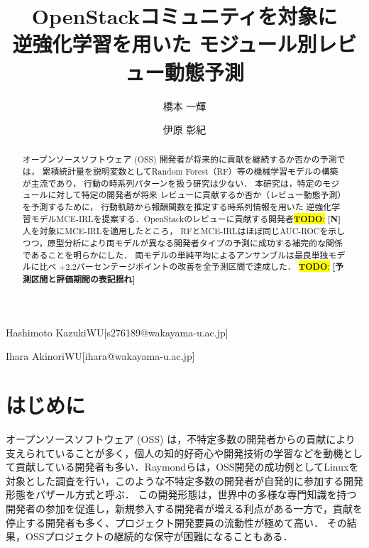 \documentclass[submit,noauthor,ses,dvipdfmx]{ipsj}
\newcommand{\todo}[1]{\colorbox{yellow}{{\bf TODO}:}{\color{red} {\textbf{[#1]}}}}
\begin{document}
\raggedbottom


\title{OpenStackコミュニティを対象に\\逆強化学習を用いた
モジュール別レビュー動態予測}




\author{橋本  一輝}{Hashimoto Kazuki}{WU}[s276189@wakayama-u.ac.jp]
\author{伊原  彰紀}{Ihara Akinori}{WU}[ihara@wakayama-u.ac.jp]

\begin{abstract}
オープンソースソフトウェア (OSS) 開発者が将来的に貢献を継続するか否かの予測では， 累積統計量を説明変数としてRandom Forest（RF）等の機械学習モデルの構築が主流であり， 行動の時系列パターンを扱う研究は少ない． 本研究は，特定のモジュールに対して特定の開発者が将来 レビューに貢献するか否か（レビュー動態予測）を予測するために， 行動軌跡から報酬関数を推定する時系列情報を用いた 逆強化学習モデルMCE-IRLを提案する．OpenStackのレビューに貢献する開発者\todo{N}人を対象にMCE-IRLを適用したところ， RFとMCE-IRLはほぼ同じAUC-ROCを示しつつ，原型分析により両モデルが異なる開発者タイプの予測に成功する補完的な関係であることを明らかにした． 両モデルの単純平均によるアンサンブルは最良単独モデルに比べ $+2.2$パーセンテージポイントの改善を全予測区間で達成した．
\todo{予測区間と評価期間の表記揺れ}
\end{abstract}

\maketitle
\section{はじめに}\label{sec:Introduction}
オープンソースソフトウェア (OSS) は，不特定多数の開発者からの貢献により支えられていることが多く，個人の知的好奇心や開発技術の学習などを動機として貢献している開発者も多い\cite{motivation}．Raymondらは，OSS開発の成功例としてLinuxを対象とした調査を行い，このような不特定多数の開発者が自発的に参加する開発形態をバザール方式と呼ぶ\cite{bazzar}．
この開発形態は，世界中の多様な専門知識を持つ開発者の参加を促進し，新規参入する開発者が増える利点がある一方で，貢献を停止する開発者も多く、プロジェクト開発要員の流動性が極めて高い\cite{dynamics}．%
その結果，OSSプロジェクトの継続的な保守が困難になることもある\cite{pinto_otc}．
\end{document}
